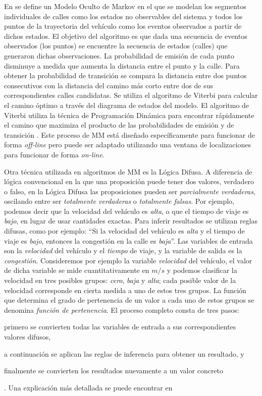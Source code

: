En \cite{newson2009hidden} se define un Modelo Oculto de Markov en el que se modelan los segmentos individuales de calles como los estados no observables del sistema y todos los puntos de la trayectoria del vehículo como los eventos observados a partir de dichos estados. El objetivo del algoritmo es que dada una secuencia de eventos observados (los puntos) se encuentre la secuencia de estados (calles) que generaron dichas observaciones. La probabilidad de emisión de cada punto disminuye a medida que aumenta la distancia entre el punto y la calle. Para obtener la probabilidad de transición se compara la distancia entre dos puntos consecutivos con la distancia del camino más corto entre dos de sus correspondientes calles candidatas. Se utiliza el algoritmo de Viterbi para calcular el camino óptimo a través del diagrama de estados del modelo. El algoritmo de Viterbi utiliza la técnica de Programación Dinámica para encontrar rápidamente el camino que maximiza el producto de las probabilidades de emisión y de transición \cite{forney1973viterbi}. Este proceso de MM está diseñado específicamente para funcionar de forma \emph{off-line} pero puede ser adaptado utilizando una ventana de localizaciones para funcionar de forma \emph{on-line}.

Otra técnica utilizada en algoritmos de MM es la Lógica Difusa. A diferencia de lógica convencional en la que una proposición puede tener dos valores, verdadero o falso, en la Lógica Difusa las proposiciones pueden ser \emph{parcialmente verdaderas}, oscilando entre ser \emph{totalmente verdaderas} o \emph{totalmente falsas}. Por ejemplo, podemos decir que la velocidad del vehículo es \emph{alta}, o que el tiempo de viaje es \emph{bajo}, en lugar de usar cantidades exactas. Para inferir resultados se utilizan reglas difusas, como por ejemplo: “Si la velocidad del vehículo es \emph{alta} y el tiempo de viaje es \emph{bajo}, entonces la congestión en la calle es \emph{baja}”. Las variables de entrada son la \emph{velocidad} del vehículo y el \emph{tiempo} de viaje, y la variable de salida es la \emph{congestión}. Consideremos por ejemplo la variable \emph{velocidad} del vehículo, el valor de dicha variable se mide cuantitativamente en $m/s$ y podemos clasificar la velocidad en tres posibles grupos: \emph{cero}, \emph{baja} y \emph{alta}; cada posible valor de la velocidad corresponde en cierta medida a uno de estos tres grupos. La función que determina el grado de pertenencia de un valor a cada uno de estos grupos se denomina \emph{función de pertenencia}. El proceso completo consta de tres pasos: \begin{enumerate*}[1)]
\item primero se convierten todas las variables de entrada a sus correspondientes valores difusos, 
\item a continuación se aplican las reglas de inferencia para obtener un resultado, y
\item finalmente se convierten los resultados nuevamente a un valor concreto
\end{enumerate*}. Una explicación más detallada se puede encontrar en \cite{zadeh1988fuzzy}

